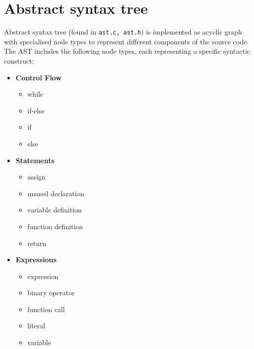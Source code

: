 \documentclass[a4paper, 11pt]{article}
\begin{document}
\section{Abstract syntax tree}\label{sec:AST}
Abstract syntax tree (found in \verb|ast.c, ast.h|) is implemented as acyclic graph with specialised node types to represent
different components of the source code.
The AST includes the following node types, each representing a specific syntactic construct: 
\newline
\noindent
\begin{minipage}[t]{0.3\textwidth}
\begin{itemize}
    \item \textbf{Control Flow}
    \begin{itemize}
        \itemsep-0.1em
        \item while
        \item if-else
        \item if
        \item else
    \end{itemize}
\end{itemize}
\end{minipage}%
\begin{minipage}[t]{0.3\textwidth}
\begin{itemize}
    \item \textbf{Statements}
    \begin{itemize}
        \itemsep-0.1em
        \item assign
        \item unused declaration
        \item variable definition
        \item function definition
        \item return
    \end{itemize}
\end{itemize}
\end{minipage}
\begin{minipage}[t]{0.3\textwidth}
\begin{itemize}
    \item \textbf{Expressions}
    \begin{itemize}
        \itemsep-0.1em
        \item expression
        \item binary operator
        \item function call
        \item literal
        \item variable
    \end{itemize}
\end{itemize}
\end{minipage}
\end{document}
